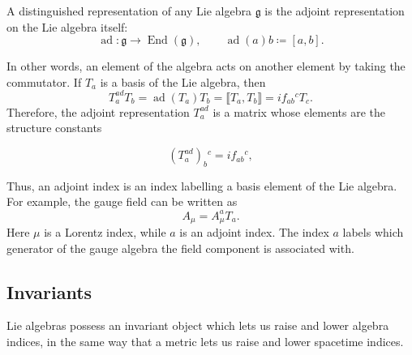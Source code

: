 \begin{definition}
A distinguished representation of any Lie algebra $\mathfrak g$ is the adjoint representation on the Lie algebra itself:
\begin{equation}
\operatorname{ad}: \mathfrak g \to \operatorname{End}(\mathfrak g),
\qquad
\operatorname{ad}(a)b \coloneqq [a,b].
\end{equation}
\end{definition}

In other words, an element of the algebra acts on another element by taking the commutator. If ${T_a}$ is a basis of the Lie algebra, then
\begin{equation}
T^{ad}_aT_b=\operatorname{ad}(T_a)T_b = \llbracket T_a,T_b\rrbracket = i f_{ab}{}^cT_c.
\end{equation}
Therefore, the adjoint representation $T^{ad}_a$ is a matrix whose elements are the structure constants

\begin{equation}
(T^{ad}_a)_b{}^c = i f_{ab}{}^{c},
\end{equation}


Thus, an adjoint index is an index labelling a basis element of the Lie algebra. For example, the gauge field can be written as
\begin{equation}
A_\mu = A_\mu^a T_a .
\end{equation}
Here $\mu$ is a Lorentz index, while $a$ is an adjoint index. The index $a$ labels which generator of the gauge algebra the field component is associated with.


\subsection{Invariants}

Lie algebras possess an invariant object which lets us raise and
lower algebra indices, in the same way that a metric lets us raise
and lower spacetime indices.

